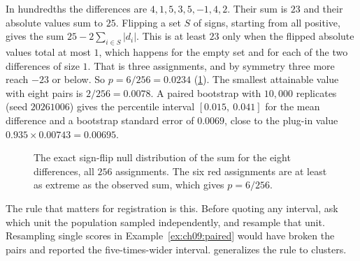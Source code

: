 \begin{example}\label{ex:ch09:signflip}
In hundredths the differences are $4,1,5,3,5,-1,4,2$. Their sum is $23$ and their absolute values sum to $25$. Flipping a set $S$ of signs, starting from all positive, gives the sum $25-2\sum_{i\in S}|d_i|$. This is at least $23$ only when the flipped absolute values total at most $1$, which happens for the empty set and for each of the two differences of size $1$. That is three assignments, and by symmetry three more reach $-23$ or below. So $p=6/256=0.0234$ (\cref{fig:ch09:perm}). The smallest attainable value with eight pairs is $2/256=0.0078$. A paired bootstrap with $10{,}000$ replicates (seed $20261006$) gives the percentile interval $[0.015,\ 0.041]$ for the mean difference and a bootstrap standard error of $0.0069$, close to the plug-in value $0.935\times0.00743=0.00695$.
\end{example}

\begin{figure}[tbp]
\centering
{}
\caption{The exact sign-flip null distribution of the sum for the eight differences, all $256$ assignments. The six red assignments are at least as extreme as the observed sum, which gives $p=6/256$.}
\label{fig:ch09:perm}
\end{figure}

The rule that matters for registration is this. Before quoting any interval, ask which unit the population sampled independently, and resample that unit. Resampling single scores in Example~\ref{ex:ch09:paired} would have broken the pairs and reported the five-times-wider interval.  generalizes the rule to clusters.

